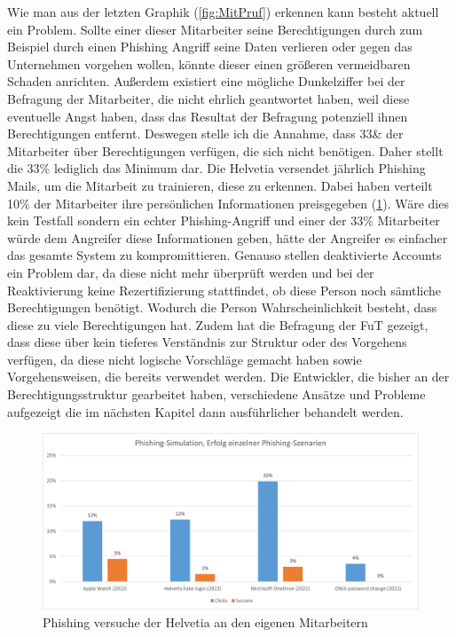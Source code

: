 Wie man aus der letzten Graphik (\ref{fig:MitPruf}) erkennen kann besteht aktuell ein Problem.
Sollte einer dieser Mitarbeiter seine Berechtigungen durch zum Beispiel durch einen Phishing Angriff seine Daten verlieren oder gegen das Unternehmen vorgehen wollen, könnte dieser einen größeren vermeidbaren Schaden anrichten.
Außerdem existiert eine mögliche Dunkelziffer bei der Befragung der Mitarbeiter, die nicht ehrlich geantwortet haben, weil diese eventuelle Angst haben, dass das Resultat der Befragung potenziell ihnen Berechtigungen entfernt.
Deswegen stelle ich die Annahme, dass 33\& der Mitarbeiter über Berechtigungen verfügen, die sich nicht benötigen.
Daher stellt die 33\% lediglich das Minimum dar.
Die Helvetia versendet jährlich Phishing Mails, um die Mitarbeit zu trainieren, diese zu erkennen.
Dabei haben verteilt 10\% der Mitarbeiter ihre persönlichen Informationen preisgegeben (\ref{fig:Bef}).
Wäre dies kein Testfall sondern ein echter Phishing-Angriff und einer der 33\% Mitarbeiter würde dem Angreifer diese Informationen geben, hätte der Angreifer es einfacher das gesamte System zu kompromittieren.
\newline
\newline
Genauso stellen deaktivierte Accounts ein Problem dar, da diese nicht mehr überprüft werden und bei der Reaktivierung keine Rezertifizierung stattfindet, ob diese Person noch sämtliche Berechtigungen benötigt.
Wodurch die Person Wahrscheinlichkeit besteht, dass diese zu viele Berechtigungen hat.
Zudem hat die Befragung der \ac{FuT} gezeigt, dass diese über kein tieferes Verständnis zur Struktur oder des Vorgehens verfügen, da diese nicht logische Vorschläge gemacht haben sowie Vorgehensweisen, die bereits verwendet werden.
Die Entwickler, die bisher an der Berechtigungsstruktur gearbeitet haben, verschiedene Ansätze und Probleme aufgezeigt die im nächsten Kapitel dann ausführlicher behandelt werden.
\begin{figure}[h!]
 \centering
 \includegraphics[width=1\textwidth]{gfx/Picture/Befragung.PNG}
 \caption{Phishing versuche der Helvetia an den eigenen Mitarbeitern \cite{Helvetia}}
 \label{fig:Bef}
\end{figure}

